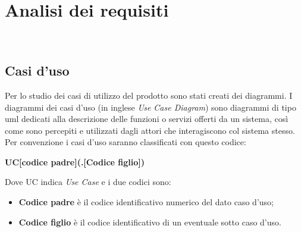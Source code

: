 \chapter{Analisi dei requisiti}
\label{cap:analisi-requisiti}

\\

\section{Casi d'uso}

Per lo studio dei casi di utilizzo del prodotto sono stati creati dei diagrammi.\newline
I diagrammi dei casi d'uso (in inglese \emph{Use Case Diagram}) sono diagrammi di tipo \gls{uml} dedicati alla descrizione delle funzioni o servizi offerti da un sistema, così come sono percepiti e utilizzati dagli attori che interagiscono col sistema stesso.\newline
Per convenzione i casi d'uso saranno classificati con questo codice:
\begin{center}
\textbf{UC[codice padre](.[Codice figlio])}
\end{center}
Dove UC indica \emph{Use Case} e i due codici sono:
\begin{itemize}
	\item \textbf{Codice padre} è il codice identificativo numerico del dato caso d’uso;
    \item \textbf{Codice figlio} è il codice identificativo di un eventuale sotto caso d’uso.
\end{itemize}


%

